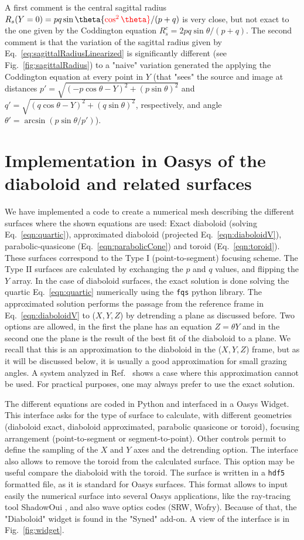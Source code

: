 \documentclass{iucr}              %
\newcommand{\inred}[1]{{\color{red}#1}}
\begin{document}
A first comment is the central sagittal radius $R_s(Y=0)=p q \sin\theta \inred{\cos^2\theta}/ (p+q)$ is very close, but not exact to the one given by the Coddington equation $R_s^c=2 p q \sin\theta / (p+q)$. The second comment is that the variation of the sagittal radius given by Eq.~\ref{eq:sagittalRadiusLinearized} is significantly different (see Fig.~\ref{fig:sagittalRadius}) to a "naive" variation generated the applying the Coddington equation at every point in $Y$ (that "sees" the source and image at distances $p'=\sqrt{(-p \cos\theta - Y)^2 + (p \sin\theta)^2}$ and $q'=\sqrt{(q \cos\theta - Y)^2 + (q \sin\theta)^2}$, respectively, and angle $\theta'=\arcsin(p \sin\theta / p')$).


\section{Implementation in Oasys of the diaboloid and related surfaces}
\label{sec:oasys}

We have implemented a code to create a numerical mesh describing the different surfaces where the shown equations are used: \inred{Exact diaboloid (solving Eq.~\ref{eqn:quartic}), approximated diaboloid (projected Eq.~\ref{eqn:diaboloidV}), parabolic-quasicone (Eq.~\ref{eqn:parabolicCone}) and toroid (Eq.~\ref{eqn:toroid})}. These surfaces correspond to the Type I (point-to-segment) focusing scheme. The Type II surfaces are calculated by exchanging the $p$ and $q$ values, and flipping the $Y$ array. In the case of diaboloid surfaces, the exact solution is done solving the quartic Eq.~\ref{eqn:quartic}  numerically using the {\tt fqs} python library. The approximated solution performs the passage from the reference frame in Eq.~\ref{eqn:diaboloidV} to ($X,Y,Z$) by detrending a plane as discussed before. Two options are allowed, in the first the plane has an equation $Z=\theta Y$ and in the second one the plane is the result of the best fit of the diaboloid to a plane. We recall that this is an approximation to the diaboloid in the ($X,Y,Z$) frame, but as it will be discussed below, it is usually a good approximation for small grazing angles. A system analyzed in Ref.~\cite{Yashchuk2019} shows a case where this approximation cannot be used. \inred{For practical purposes, one may  always prefer to use the exact solution.}

The different equations are coded in Python and interfaced in a Oasys Widget. This interface asks for the type of surface to calculate, with different geometries (diaboloid exact, diaboloid approximated, parabolic quasicone or toroid), focusing arrangement (point-to-segment or segment-to-point). Other controls permit to define the sampling of the $X$ and $Y$ axes and the detrending option. The interface also allows to remove the toroid from the calculated surface. This option may be useful compare the diaboloid with the toroid. The surface is written in a {\tt hdf5} formatted file, as it is standard for Oasys surfaces. This format allows to input easily the numerical surface into several Oasys applications, like the ray-tracing tool ShadowOui \cite{codeSHADOWOUI}, and also wave optics codes (SRW, Wofry). Because of that, the "Diaboloid" widget is found in the "Syned" add-on. A view of the interface is in Fig.~\ref{fig:widget}.
\end{document}
